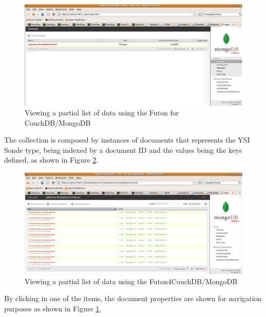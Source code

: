\begin{figure}[h]
  \centering
  \includegraphics[scale=0.6]{../diagrams/view-collections-instance-browser-futondb}
  \caption{Viewing a partial list of data using the Futon for CouchDB/MongoDB}
  \label{fig:view-collections-instance-browser-futondb}
\end{figure}

The collection is composed by instances of documents that represents the YSI
Sonde type, being indexed by a document ID and the values being the keys
defined, as shown in Figure \ref{fig:view-collected-data-list-browser-futondb}.

\begin{figure}[!h]
  \centering
  \includegraphics[scale=0.65]{../diagrams/view-collected-data-list-browser-futondb}
  \caption{Viewing a partial list of data using the Futon4CouchDB/MongoDB}
  \label{fig:view-collected-data-list-browser-futondb}
\end{figure}

By clicking in one of the items, the document properties are shown for
navigation purposes as shown in Figure
\ref{fig:view-collections-instance-browser-futondb}.

